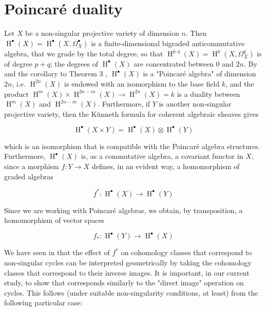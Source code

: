 \section{Poincar\'{e} duality}\label{fga1-7}


Let $X$ be a non-singular projective variety of dimension $n$.
Then $\operatorname{H}^\bullet(X)=\operatorname{H}^\bullet(X,\Omega_X^\bullet)$ is a finite-dimensional bigraded anticommutative algebra, that we grade by the total degree, so that $\operatorname{H}^{p,q}(X)=\operatorname{H}^p(X,\Omega_X^q)$ is of degree $p+q$;
the degrees of $\operatorname{H}^\bullet(X)$ are concentrated between $0$ and $2n$.
By  and the corollary to Theorem 3 , $\operatorname{H}^\bullet(X)$ is a "Poincaré algebra" of dimension $2n$, i.e. $\operatorname{H}^{2n}(X)$ is endowed with an isomorphism to the base field $k$, and the product $\operatorname{H}^m(X)\times\operatorname{H}^{2n-m}(X)\to\operatorname{H}^{2n}(X)=k$ is a duality between $\operatorname{H}^m(X)$ and $\operatorname{H}^{2n-m}(X)$.
Furthermore, if $Y$ is another non-singular projective variety, then the Künneth formula for coherent algebraic sheaves gives

\begin{equation}\tag{7.1}\label{fga1-equation-7.1}
  \operatorname{H}^\bullet(X\times Y) = \operatorname{H}^\bullet(X)\otimes\operatorname{H}^\bullet(Y)
\end{equation}

which is an isomorphism that is compatible with the Poincaré algebra structures.
Furthermore, $\operatorname{H}^\bullet(X)$ is, as a commutative algebra, a covariant functor in $X$, since a morphism $f\colon Y\to X$ defines, in an evident way, a homomorphism of graded algebras

\begin{equation}\tag{7.2}\label{fga1-equation-7.2}
  f^*\colon \operatorname{H}^\bullet(X)\to\operatorname{H}^\bullet(Y)
\end{equation}

Since we are working with Poincaré algebras, we obtain, by transposition, a homomorphism of vector spaces

\begin{equation}\tag{7.3}\label{fga1-equation-7.3}
  f_*\colon \operatorname{H}^\bullet(Y)\to\operatorname{H}^\bullet(X)
\end{equation}

We have seen in  that the effect of $f^*$ on cohomology classes that correspond to non-singular cycles can be interpreted geometrically by taking the cohomology classes that correspond to their inverse images.
It is important, in our current study, to show that  corresponds similarly to the "direct image" operation on cycles.
This follows (under suitable non-singularity conditions, at least) from the following particular case:

